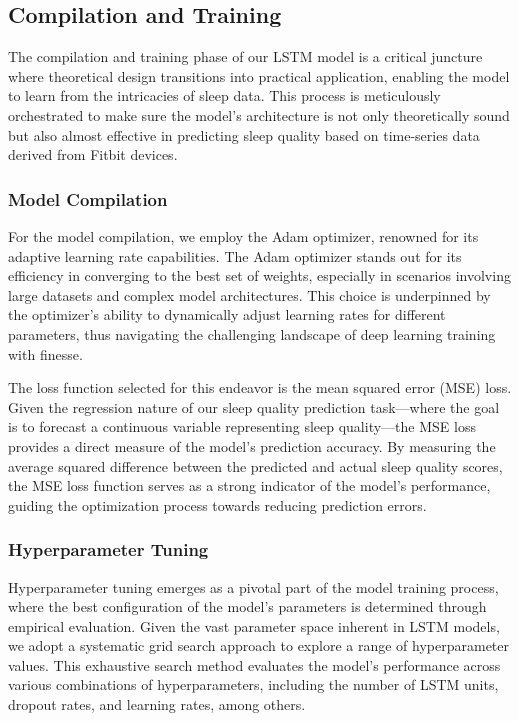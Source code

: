 \documentclass[10pt]{extarticle}
\begin{document}
\subsection{Compilation and Training}

The compilation and training phase of our LSTM model is a critical juncture where theoretical design transitions into practical application, enabling the model to learn from the intricacies of sleep data. This process is meticulously orchestrated to make sure the model's architecture is not only theoretically sound but also almost effective in predicting sleep quality based on time-series data derived from Fitbit devices.

\subsubsection{Model Compilation}

For the model compilation, we employ the Adam optimizer, renowned for its adaptive learning rate capabilities. The Adam optimizer stands out for its efficiency in converging to the best set of weights, especially in scenarios involving large datasets and complex model architectures. This choice is underpinned by the optimizer's ability to dynamically adjust learning rates for different parameters, thus navigating the challenging landscape of deep learning training with finesse.

The loss function selected for this endeavor is the mean squared error (MSE) loss. Given the regression nature of our sleep quality prediction task—where the goal is to forecast a continuous variable representing sleep quality---the MSE loss provides a direct measure of the model's prediction accuracy. By measuring the average squared difference between the predicted and actual sleep quality scores, the MSE loss function serves as a strong indicator of the model's performance, guiding the optimization process towards reducing prediction errors.

\subsubsection{Hyperparameter Tuning}

Hyperparameter tuning emerges as a pivotal part of the model training process, where the best configuration of the model's parameters is determined through empirical evaluation. Given the vast parameter space inherent in LSTM models, we adopt a systematic grid search approach to explore a range of hyperparameter values. This exhaustive search method evaluates the model's performance across various combinations of hyperparameters, including the number of LSTM units, dropout rates, and learning rates, among others.
\end{document}
